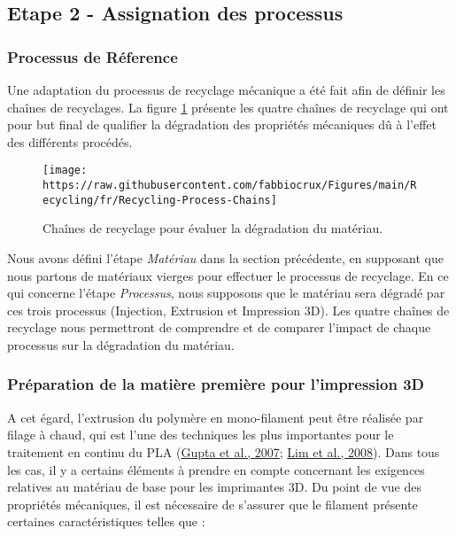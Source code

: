 \documentclass[
]{article}
\begin{document}
\hypertarget{etape-2---assignation-des-processus}{%
\subsection{Etape 2 - Assignation des processus}\label{etape-2---assignation-des-processus}}

\hypertarget{processus-de-ruxe9ference}{%
\subsubsection{Processus de Réference}\label{processus-de-ruxe9ference}}

Une adaptation du processus de recyclage mécanique a été fait afin de définir les chaînes de recyclages.
La figure \ref{fig:Recycling-Process-Chains-Fr} présente les quatre chaînes de recyclage qui ont pour but final de qualifier la dégradation des propriétés mécaniques dû à l'effet des différents procédés.

\begin{figure}

{\centering \texttt{[image: https://raw.githubusercontent.com/fabbiocrux/Figures/main/Recycling/fr/Recycling-Process-Chains]} 

}

\caption{Chaînes de recyclage pour évaluer la dégradation du matériau.}\label{fig:Recycling-Process-Chains-Fr}
\end{figure}

Nous avons défini l'étape \emph{Matériau} dans la section précédente, en supposant que nous partons de matériaux vierges pour effectuer le processus de recyclage.
En ce qui concerne l'étape \emph{Processus}, nous supposons que le matériau sera dégradé par ces trois processus (Injection, Extrusion et Impression 3D).
Les quatre chaînes de recyclage nous permettront de comprendre et de comparer l'impact de chaque processus sur la dégradation du matériau.

\hypertarget{pruxe9paration-de-la-matiuxe8re-premiuxe8re-pour-limpression-3d}{%
\subsubsection{Préparation de la matière première pour l'impression 3D}\label{pruxe9paration-de-la-matiuxe8re-premiuxe8re-pour-limpression-3d}}

A cet égard, l'extrusion du polymère en mono-filament peut être réalisée par filage à chaud, qui est l'une des techniques les plus importantes pour le traitement en continu du PLA (\protect\hyperlink{ref-Gupta2007}{Gupta et al., 2007}; \protect\hyperlink{ref-Lim2008}{Lim et al., 2008}).
Dans tous les cas, il y a certains éléments à prendre en compte concernant les exigences relatives au matériau de base pour les imprimantes 3D. Du point de vue des propriétés mécaniques, il est nécessaire de s'assurer que le filament présente certaines caractéristiques telles que :
\end{document}
